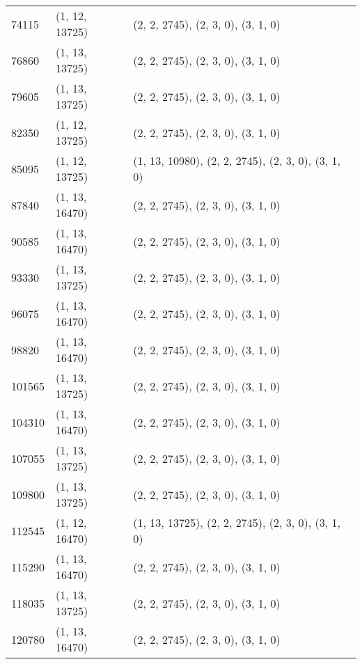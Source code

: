 \begin{longtable}{@{\extracolsep{\fill}}lll}
	74115              & (1, 12, 13725)              & (2, 2, 2745), (2, 3, 0), (3, 1, 0)                  \\
	76860              & (1, 13, 13725)              & (2, 2, 2745), (2, 3, 0), (3, 1, 0)                  \\
	79605              & (1, 13, 13725)              & (2, 2, 2745), (2, 3, 0), (3, 1, 0)                  \\
	82350              & (1, 12, 13725)              & (2, 2, 2745), (2, 3, 0), (3, 1, 0)                  \\
	85095              & (1, 12, 13725)              & (1, 13, 10980), (2, 2, 2745), (2, 3, 0), (3, 1, 0)  \\
	87840              & (1, 13, 16470)              & (2, 2, 2745), (2, 3, 0), (3, 1, 0)                  \\
	90585              & (1, 13, 16470)              & (2, 2, 2745), (2, 3, 0), (3, 1, 0)                  \\
	93330              & (1, 13, 13725)              & (2, 2, 2745), (2, 3, 0), (3, 1, 0)                  \\
	96075              & (1, 13, 16470)              & (2, 2, 2745), (2, 3, 0), (3, 1, 0)                  \\
	98820              & (1, 13, 16470)              & (2, 2, 2745), (2, 3, 0), (3, 1, 0)                  \\
	101565             & (1, 13, 13725)              & (2, 2, 2745), (2, 3, 0), (3, 1, 0)                  \\
	104310             & (1, 13, 16470)              & (2, 2, 2745), (2, 3, 0), (3, 1, 0)                  \\
	107055             & (1, 13, 13725)              & (2, 2, 2745), (2, 3, 0), (3, 1, 0)                  \\
	109800             & (1, 13, 13725)              & (2, 2, 2745), (2, 3, 0), (3, 1, 0)                  \\
	112545             & (1, 12, 16470)              & (1, 13, 13725), (2, 2, 2745), (2, 3, 0), (3, 1, 0)  \\
	115290             & (1, 13, 16470)              & (2, 2, 2745), (2, 3, 0), (3, 1, 0)                  \\
	118035             & (1, 13, 13725)              & (2, 2, 2745), (2, 3, 0), (3, 1, 0)                  \\
	120780             & (1, 13, 16470)              & (2, 2, 2745), (2, 3, 0), (3, 1, 0)                  \\

\end{longtable}

